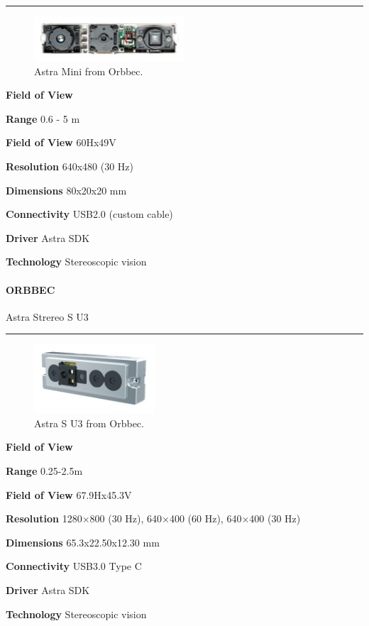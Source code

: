 \documentclass[../main.tex]{subfiles}
\begin{document}
\noindent\rule{8cm}{0.1pt}
\begin{figure}[H]
    \centering
    \includegraphics[width=0.5\textwidth]{images/astra_mini.png}
    \caption{Astra Mini from Orbbec.}
    \label{fig:astra_mini}
\end{figure}
\begin{labeling}{\textbf{Field of View    }}
    \setlength{\itemindent}{2em}
    \item [\textbf{Range}] 0.6 - 5 m
    \item [\textbf{Field of View}] 60Hx49V
    \item [\textbf{Resolution}] 640x480 (30 Hz)
    \item [\textbf{Dimensions}] 80x20x20 mm
    \item [\textbf{Connectivity}] USB2.0 (custom cable)
    \item [\textbf{Driver}] Astra SDK
    \item [\textbf{Technology}] Stereoscopic vision
\end{labeling}
\vspace{1em}
\paragraph{\large \textbf{ORBBEC}} {\large Astra Strereo S U3}

\noindent\rule{8cm}{0.1pt}
\begin{figure}[H]
    \centering
    \includegraphics[width=0.4\textwidth]{images/astra_su3.png}
    \caption{Astra S U3 from Orbbec.}
    \label{fig:astra_su3}
\end{figure}
\begin{labeling}{\textbf{Field of View    }}
    \setlength{\itemindent}{2em}
    \item [\textbf{Range}] 0.25-2.5m
    \item [\textbf{Field of View}] 67.9Hx45.3V
    \item [\textbf{Resolution}] 1280×800 (30 Hz), 640×400 (60 Hz), 640×400 (30 Hz)
    \item [\textbf{Dimensions}] 65.3x22.50x12.30 mm
    \item [\textbf{Connectivity}] USB3.0 Type C
    \item [\textbf{Driver}] Astra SDK
    \item [\textbf{Technology}] Stereoscopic vision
\end{labeling}
\vspace{1em}
\end{document}
